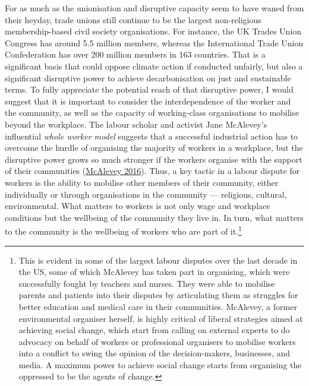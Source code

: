 \documentclass[a4paper, nobind]{templates/ociamthesis}
\begin{document}
For as much as the unionisation and disruptive capacity seem to have waned from their heyday, trade unions still continue to be the largest non-religious membership-based civil society organisations. For instance, the UK Trades Union Congress has around 5.5 million members, whereas the International Trade Union Confederation has over 200 million members in 163 countries. That is a significant basis that could oppose climate action if conducted unfairly, but also a significant disruptive power to achieve decarbonisation on just and sustainable terms. To fully appreciate the potential reach of that disruptive power, I would suggest that it is important to consider the interdependence of the worker and the community, as well as the capacity of working-class organisations to mobilise beyond the workplace. The labour scholar and activist Jane McAlevey's influential \emph{whole worker model} suggests that a successful industrial action has to overcome the hurdle of organising the majority of workers in a workplace, but the disruptive power grows so much stronger if the workers organise with the support of their communities (\protect\hyperlink{ref-mcalevey_no_2016}{McAlevey 2016}). Thus, a key tactic in a labour dispute for workers is the ability to mobilise other members of their community, either individually or through organisations in the community --- religious, cultural, environmental. What matters to workers is not only wage and workplace conditions but the wellbeing of the community they live in. In turn, what matters to the community is the wellbeing of workers who are part of it.\footnote{This is evident in some of the largest labour disputes over the last decade in the US, some of which McAlevey has taken part in organising, which were successfully fought by teachers and nurses. They were able to mobilise parents and patients into their disputes by articulating them as struggles for better education and medical care in their communities. McAlevey, a former environmental organiser herself, is highly critical of liberal strategies aimed at achieving social change, which start from calling on external experts to do advocacy on behalf of workers or professional organisers to mobilise workers into a conflict to swing the opinion of the decision-makers, businesses, and media. A maximum power to achieve social change starts from organising the oppressed to be the agents of change.}
\end{document}
